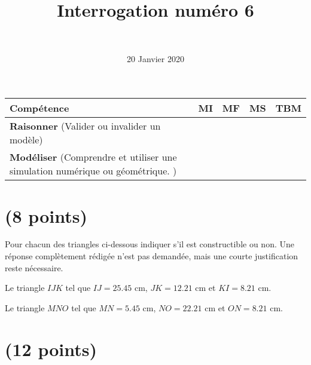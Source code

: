 \documentclass[a4paper,11pt]{exam}
\author{\ }
\date{20 Janvier 2020}
\title{Interrogation num\'ero 6}
\begin{document}
%	

\maketitle


\begin{small}
	\begin{center}
		\begin{tabular}{|@{\ }l@{\ }|@{\ }c@{\ }|@{\ }c@{\ }|@{\ }c@{\ }|@{\ }c@{\ }|}
			\hline
			\textbf{Compétence} & \textbf{MI} & \textbf{MF} & \textbf{MS} & \textbf{TBM} \\
			
			\hline	
			 \textbf{Raisonner} (Valider ou invalider un modèle) &  \ \ & \ \ & \ \ & \ \  \\
			\hline
			\textbf{Modéliser} (Comprendre et utiliser une simulation numérique ou géométrique. )&  \ \ & \ \ & \ \ & \ \  \\			
			\hline
		\end{tabular}
	\end{center}
\end{small}

\vspace*{-0.7cm}
\section{(8 points)}
\vspace*{-0.3cm}
Pour chacun des triangles ci-dessous indiquer s'il est constructible ou non. Une réponse complètement rédigée n'est pas demandée, mais une courte justification reste nécessaire.

\begin{questions}
	\question[4]
	Le triangle $IJK$ tel que $IJ = \num{25.45}$ cm, $JK = \num{12.21}$ cm et $KI = \num{8.21}$ cm.
	
	\fillwithdottedlines{1cm}
	
	\question[4]
	
	Le triangle $MNO$ tel que $MN = \num{5.45}$ cm, $NO = \num{22.21}$ cm et $ON = \num{8.21}$ cm.
	
	\fillwithdottedlines{1cm}
\end{questions}


\vspace*{-0.5cm}

\section{(12 points)}
\end{document}
